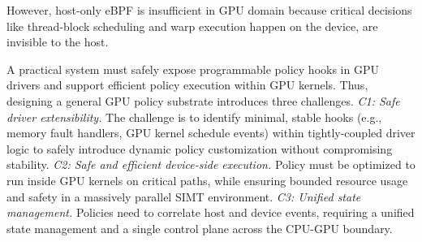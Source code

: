 However, host-only eBPF is insufficient in GPU domain because critical decisions like thread-block scheduling and warp execution happen on the device, are invisible to the host. 


A practical system must safely expose programmable policy hooks in GPU drivers and support efficient policy execution within GPU kernels. 
Thus, designing a general GPU policy substrate introduces three challenges.
\emph{C1: Safe driver extensibility.} The challenge is to identify minimal, stable hooks (e.g., memory fault handlers, GPU kernel schedule events) within tightly-coupled driver logic to safely introduce dynamic policy customization without compromising stability. \emph{C2: Safe and efficient device-side execution.} Policy must be optimized to run inside GPU kernels on critical paths, while ensuring bounded resource usage and safety in a massively parallel SIMT environment. \emph{C3: Unified state management.} Policies need to correlate host and device events, requiring a unified state management and a single control plane across the CPU-GPU boundary.

